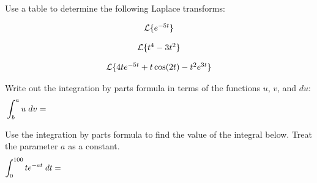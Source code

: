 

\begin{problem}
\item Use a table to determine the following Laplace transforms:

  \begin{subproblem}
  \item 
    \begin{eqnarray}
      \laplace{e^{-5t}}
    \end{eqnarray}
    \vfill

  \item 
    \begin{eqnarray}
      \laplace{t^4-3t^2}
    \end{eqnarray}
    \vfill
      
  \item 
    \begin{eqnarray}
      \laplace{4te^{-5t} + t\cos(2t) - t^2e^{3t}}
    \end{eqnarray}
    \vfill

  \end{subproblem}

  \clearpage

\item Write out the integration by parts formula in terms of the
  functions $u$, $v$, and $du$:
  \begin{eqnarray}
      \int^a_b u \; dv  = && \hspace*{30em}  \nonumber
  \end{eqnarray}

  \vfill

\item Use the integration by parts formula to find the value of the
  integral below.  Treat the parameter $a$ as a constant.
  \begin{eqnarray}
      \int^{100}_0 t e^{-at} \; dt  = && \hspace*{30em}  \nonumber
  \end{eqnarray}

  \vfill

\end{problem}


